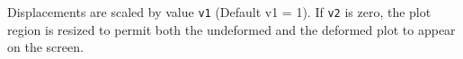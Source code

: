 \headb

Displacements are scaled by value {\tt v1} (Default v1 = 1).
If {\tt v2} is zero, the plot region is resized to permit
both the undeformed and the deformed plot to appear on the screen.
\vfill
\eject
